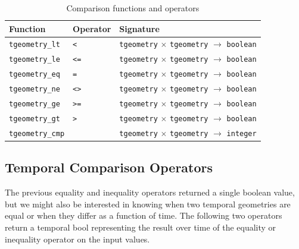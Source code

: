 \begin{table}[htb]
    \centering
    \begin{tabularx}{\textwidth}{|l|l|X|}
    \hline
    \textbf{Function}   & \textbf{Operator} & \textbf{Signature} \\
    \hline
    \lstinline+tgeometry_lt+    & \lstinline+<+    & \lstinline+tgeometry+ $\times$ \lstinline+tgeometry+ $\rightarrow$ \lstinline+boolean+ \\
    \hline
    \lstinline+tgeometry_le+    & \lstinline+<=+   & \lstinline+tgeometry+ $\times$ \lstinline+tgeometry+ $\rightarrow$ \lstinline+boolean+ \\
    \hline
    \lstinline+tgeometry_eq+    & \lstinline+=+    & \lstinline+tgeometry+ $\times$ \lstinline+tgeometry+ $\rightarrow$ \lstinline+boolean+ \\
    \hline
    \lstinline+tgeometry_ne+    & \lstinline+<>+   & \lstinline+tgeometry+ $\times$ \lstinline+tgeometry+ $\rightarrow$ \lstinline+boolean+ \\
    \hline
    \lstinline+tgeometry_ge+    & \lstinline+>=+   & \lstinline+tgeometry+ $\times$ \lstinline+tgeometry+ $\rightarrow$ \lstinline+boolean+ \\
    \hline
    \lstinline+tgeometry_gt+    & \lstinline+>+    & \lstinline+tgeometry+ $\times$ \lstinline+tgeometry+ $\rightarrow$ \lstinline+boolean+ \\
    \hline
    \lstinline+tgeometry_cmp+   &                  & \lstinline+tgeometry+ $\times$ \lstinline+tgeometry+ $\rightarrow$ \lstinline+integer+ \\
    \hline
    \end{tabularx}
    \caption{Comparison functions and operators}
    \label{table:comparison_funcs}
\end{table}

\subsection{Temporal Comparison Operators}
\label{section:temporal_comparison}

The previous equality and inequality operators returned a single boolean value, but we might also be interested in knowing when two temporal geometries are equal or when they differ as a function of time. The following two operators return a temporal bool representing the result over time of the equality or inequality operator on the input values.

